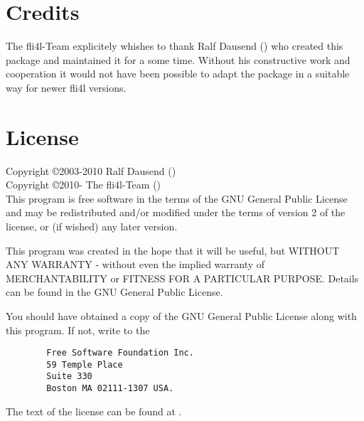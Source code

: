 \section{Credits}

The fli4l-Team explicitely whishes to thank Ralf Dausend
() who created this package and
maintained it for a some time. Without his constructive work and
cooperation it would not have been possible to adapt the package
in a suitable way for newer fli4l versions.

\section{License}

Copyright \copyright  2003-2010 Ralf Dausend () \\
Copyright \copyright  2010-     The fli4l-Team () \\

This program is free software in the terms of the GNU General Public License
and may be redistributed and/or modified under the terms of version 2 of the
license, or (if wished) any later version.

This program was created in the hope that it will be useful,
but WITHOUT ANY WARRANTY - without even the implied warranty
of MERCHANTABILITY or FITNESS FOR A PARTICULAR PURPOSE.
Details can be found in the GNU General Public License.

You should have obtained a copy of the GNU General Public License along
with this program. If not, write to the

\begin{verbatim}
		Free Software Foundation Inc.
		59 Temple Place
		Suite 330
		Boston MA 02111-1307 USA.
\end{verbatim}

The text of the license can be found at .
